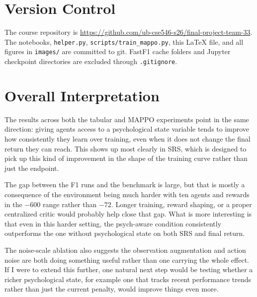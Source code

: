 \documentclass[11pt]{article}
\begin{document}
\section{Version Control}

The course repository is
\url{https://github.com/ub-cse546-s26/final-project-team-33}. The notebooks,
\texttt{helper.py}, \texttt{scripts/train\_mappo.py}, this \LaTeX{} file, and all
figures in \texttt{images/} are committed to git. FastF1 cache folders and Jupyter
checkpoint directories are excluded through \texttt{.gitignore}.

\section{Overall Interpretation}

The results across both the tabular and MAPPO experiments point in the same direction:
giving agents access to a psychological state variable tends to improve how consistently
they learn over training, even when it does not change the final return they can reach.
This shows up most clearly in SRS, which is designed to pick up this kind of improvement
in the shape of the training curve rather than just the endpoint.

The gap between the F1 runs and the benchmark is large, but that is mostly a consequence
of the environment being much harder with ten agents and rewards in the $-600$ range
rather than $-72$. Longer training, reward shaping, or a proper centralized critic would
probably help close that gap. What is more interesting is that even in this harder setting,
the psych-aware condition consistently outperforms the one without psychological state on
both SRS and final return.

The noise-scale ablation also suggests the observation augmentation and action noise are
both doing something useful rather than one carrying the whole effect. If I were to extend
this further, one natural next step would be testing whether a richer psychological state,
for example one that tracks recent performance trends rather than just the current penalty,
would improve things even more.
\end{document}

